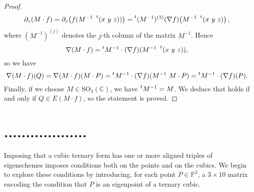 \documentclass[12pt, a4paper, reqno, captions=tableheading,bibliography=totoc]{scrartcl}
\theoremstyle{plain}
\theoremstyle{definition}
\newcommand{\p}{\mathbb{P}}
\begin{document}
\begin{proof}
\begin{gather*}
\partial_z (M\cdot f) = \partial_z  \bigl( f(M^{-1}  \ \prescript{t} {} (x \ y \ z)) \bigr) = \prescript{t} {}(M^{-1})^{(3)}(\nabla f) \bigl( M^{-1}\   \prescript{t} {} (x \ y \ z) \bigr) \,,
\end{gather*}
%
where $(M^{-1})^{(j)}$ denotes the $j$-th column of the matrix $M^{-1}$. Hence
%
\[
\nabla (M \cdot f) = \prescript{t} {} M^{-1} \cdot (\nabla f) (M^{-1}\   \prescript{t} {} (x \ y \ z)),
\]
%
so we have
%
\[
\nabla (M \cdot f)(Q)=\nabla (M \cdot f)(M \cdot P)=
\prescript{t} {} M^{-1} \cdot (\nabla f) (M^{-1}\   M \cdot P)=\prescript{t} {} M^{-1} \cdot (\nabla f)(P).
\]
%
Finally, if we choose $M \in \mathrm{SO}_3(\mathbb{C})$, we have
$\prescript{t} {} M^{-1}=M$. We deduce that
 holds if and only if $Q \in E(M\cdot f)$, so the statement is proved.
\end{proof}

\section{...................}

Imposing that a cubic ternary form has one or more aligned triples of eigenschemes imposes conditions both on the points and on the cubics.
We begin to explore these conditions by introducing, for each point
$P \in \p^2$,
a $3 \times 10$ matrix encoding the condition that $P$ is an eigenpoint of a ternary cubic.
\end{document}
